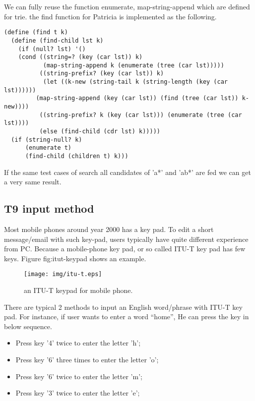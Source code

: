 \documentclass{article}
\begin{document}
We can fully reuse the function enumerate, map-string-append which are
defined for trie. the find function for Patricia is implemented as the
following.

\begin{lstlisting}
(define (find t k)
  (define (find-child lst k)
    (if (null? lst) '()
	(cond ((string=? (key (car lst)) k)
	       (map-string-append k (enumerate (tree (car lst)))))
	      ((string-prefix? (key (car lst)) k)
	       (let ((k-new (string-tail k (string-length (key (car lst))))))
		 (map-string-append (key (car lst)) (find (tree (car lst)) k-new))))
	      ((string-prefix? k (key (car lst))) (enumerate (tree (car lst))))
	      (else (find-child (cdr lst) k)))))
  (if (string-null? k)
      (enumerate t)
      (find-child (children t) k)))
\end{lstlisting}

If the same test cases of search all candidates of 'a*' and 'ab*' are
fed we can get a very same result.


\subsection{T9 input method}
Most mobile phones around year 2000 has a key pad. To edit a short message/email
with such key-pad, users typically have quite different experience from PC.
Because a mobile-phone key pad, or so called ITU-T key pad has few keys.
Figure {fig:itut-keypad} shows an example.

\begin{figure}[htbp]
       \begin{center}
	\texttt{[image: img/itu-t.eps]}
        \caption{an ITU-T keypad for mobile phone.}
        \label{fig:itut-keypad}
       \end{center}
\end{figure}

There are typical 2 methods to input an English word/phrase with ITU-T key pad.
For instance, if user wants to enter a word ``home'', He can press the key
in below sequence.

\begin{itemize}
\item Press key '4' twice to enter the letter 'h';
\item Press key '6' three times to enter the letter 'o';
\item Press key '6' twice to enter the letter 'm';
\item Press key '3' twice to enter the letter 'e';
\end{itemize}
\end{document}
